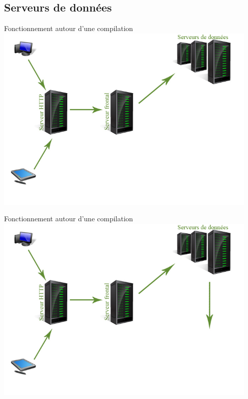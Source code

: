 \documentclass{beamer}
\begin{document}
\subsection{Serveurs de données}
\begin{frame}{Fonctionnement autour d'une compilation}
 	\includegraphics[width=0.95\textwidth]{./images/step5}
\end{frame}
\begin{frame}{Fonctionnement autour d'une compilation}
 	\includegraphics[width=0.95\textwidth]{./images/step6}
\end{frame}
\end{document}
